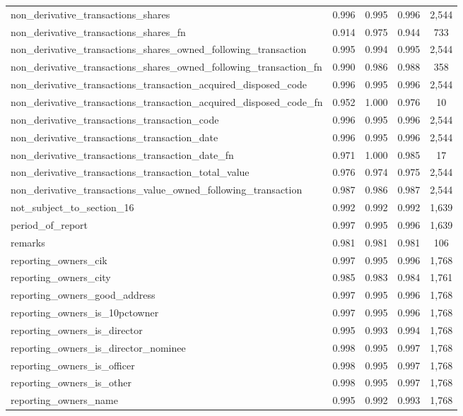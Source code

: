\documentclass[journal, onecolumn]{IEEEtran}
\begin{document}
\begin{small}
\begin{longtable}{lcccc}
non\_derivative\_transactions\_shares & 0.996 & 0.995 & 0.996 & 2,544 \\
non\_derivative\_transactions\_shares\_fn & 0.914 & 0.975 & 0.944 & 733 \\
non\_derivative\_transactions\_shares\_owned\_following\_transaction & 0.995 & 0.994 & 0.995 & 2,544 \\
non\_derivative\_transactions\_shares\_owned\_following\_transaction\_fn & 0.990 & 0.986 & 0.988 & 358 \\
non\_derivative\_transactions\_transaction\_acquired\_disposed\_code & 0.996 & 0.995 & 0.996 & 2,544 \\
non\_derivative\_transactions\_transaction\_acquired\_disposed\_code\_fn & 0.952 & 1.000 & 0.976 & 10 \\
non\_derivative\_transactions\_transaction\_code & 0.996 & 0.995 & 0.996 & 2,544 \\
non\_derivative\_transactions\_transaction\_date & 0.996 & 0.995 & 0.996 & 2,544 \\
non\_derivative\_transactions\_transaction\_date\_fn & 0.971 & 1.000 & 0.985 & 17 \\
non\_derivative\_transactions\_transaction\_total\_value & 0.976 & 0.974 & 0.975 & 2,544 \\
non\_derivative\_transactions\_value\_owned\_following\_transaction & 0.987 & 0.986 & 0.987 & 2,544 \\
not\_subject\_to\_section\_16 & 0.992 & 0.992 & 0.992 & 1,639 \\
period\_of\_report & 0.997 & 0.995 & 0.996 & 1,639 \\
remarks & 0.981 & 0.981 & 0.981 & 106 \\
reporting\_owners\_cik & 0.997 & 0.995 & 0.996 & 1,768 \\
reporting\_owners\_city & 0.985 & 0.983 & 0.984 & 1,761 \\
reporting\_owners\_good\_address & 0.997 & 0.995 & 0.996 & 1,768 \\
reporting\_owners\_is\_10pctowner & 0.997 & 0.995 & 0.996 & 1,768 \\
reporting\_owners\_is\_director & 0.995 & 0.993 & 0.994 & 1,768 \\
reporting\_owners\_is\_director\_nominee & 0.998 & 0.995 & 0.997 & 1,768 \\
reporting\_owners\_is\_officer & 0.998 & 0.995 & 0.997 & 1,768 \\
reporting\_owners\_is\_other & 0.998 & 0.995 & 0.997 & 1,768 \\
reporting\_owners\_name & 0.995 & 0.992 & 0.993 & 1,768 \\

\end{longtable}
\end{small}
\end{document}

